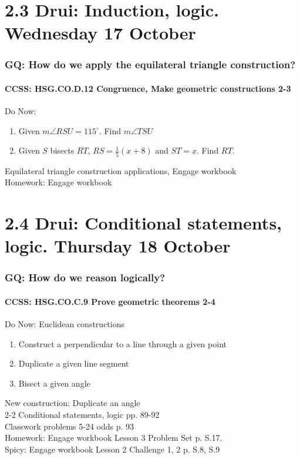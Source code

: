 \documentclass{beamer}
\begin{document}
\section{2.3 Drui: Induction, logic. Wednesday 17 October}
  \frame
  {
    \frametitle{GQ: How do we apply the equilateral triangle construction?}
    \framesubtitle{CCSS: HSG.CO.D.12 Congruence, Make geometric constructions  \alert{2-3}}

    \begin{block}{Do Now:}
      \begin{center}
      \end{center}
      \begin{enumerate}
        \item Given $m\angle RSU = 115^\circ$. Find $m\angle TSU$
        \item Given $S$ bisects $\overline{RT}$, $RS=\frac{1}{5} (x+8)$ and $ST = x$. Find $RT$.
    \end{enumerate}
    \end{block}
    Equilateral triangle construction applications, Engage workbook\\
    \vspace{0.25cm}
    Homework: Engage workbook
  }

\section{2.4 Drui: Conditional statements, logic. Thursday 18 October}
  \frame
  {
    \frametitle{GQ: How do we reason logically?}
    \framesubtitle{CCSS: HSG.CO.C.9 Prove geometric theorems  \alert{2-4}}

    \begin{block}{Do Now: Euclidean constructions}
    \begin{enumerate}
        \item Construct a perpendicular to a line through a given point
        \item Duplicate a given line segment
        \item Bisect a given angle
    \end{enumerate}
    \end{block}
    New construction: Duplicate an angle\\
    2-2 Conditional statements, logic  pp. 89-92\\
    Classwork problems 5-24 odds p. 93\\
    \vspace{0.5cm}
    Homework: Engage workbook Lesson 3 Problem Set p. S.17. \\
    Spicy: Engage workbook Lesson 2 Challenge 1, 2 p. S.8, S.9
  }
\end{document}
